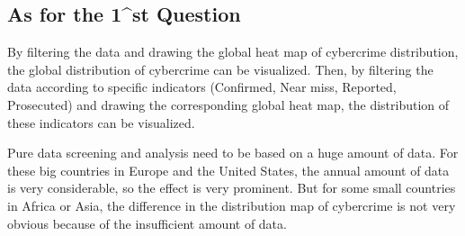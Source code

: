 
\subsection{As for the 1^{st} Question} %
    By filtering the data and drawing the global heat map of cybercrime distribution,
    the global distribution of cybercrime can be visualized.
    Then, by filtering the data according to specific indicators
    (Confirmed, Near miss, Reported, Prosecuted)
    and drawing the corresponding global heat map,
    the distribution of these indicators can be visualized.

    Pure data screening and analysis need to be based on a huge amount of data.
    For these big countries in Europe and the United States, the annual amount of data is very considerable,
    so the effect is very prominent.
    But for some small countries in Africa or Asia,
    the difference in the distribution map of cybercrime is not very obvious because of the insufficient amount of data.

